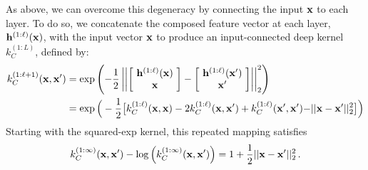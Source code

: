 As above, we can overcome this degeneracy by connecting the input ${\bf{x}}$ to each layer.
To do so, we concatenate the composed feature vector at each layer, ${\bf{h}}^{(1:\ell)}({\bf{x}})$, with the input vector ${\bf{x}}$ to produce an input-connected deep kernel $k_C^{(1:L)}$, defined by:
%
\begin{align}
k_C^{(1:\ell + 1)}({\bf{x}}, {\bf{x}}')
& = \exp \left( -\frac{1}{2} \left|\left| 
\left[ \! \begin{array}{c} {\bf{h}}^{(1:\ell)}({\bf{x}}) \\ {\bf{x}} \end{array} \! \right] - 
\left[ \! \begin{array}{c} {\bf{h}}^{(1:\ell)}({\bf{x}}') \\ {\bf{x}}' \end{array} \! \right] \right| \right|_2^2 \right) \\
& = \exp \Big( -\frac{1}{2} \big[ k_C^{(1:\ell)}({\bf{x}}, {\bf{x}}) - 2 k_C^{(1:\ell)}({\bf{x}}, {\bf{x}}') 
 + k_C^{(1:\ell)}({\bf{x}}', {\bf{x}}') {\color{black} - || {\bf{x}} - {\bf{x}}' ||_2^2} \big] \Big) \nonumber
\end{align}
%
Starting with the squared-exp kernel, this repeated mapping satisfies
\begin{align}
k_C^{(1:\infty)}({\bf{x}}, {\bf{x}}') - \log \left( k_C^{(1:\infty)}({\bf{x}}, {\bf{x}}') \right) = 1 + \frac{1}{2} || {\bf{x}} - {\bf{x}}' ||_2^2 \,.
\end{align}
%
